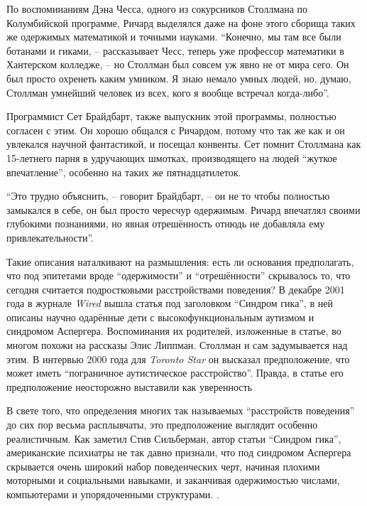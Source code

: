 По воспоминаниям Дэна Чесса, одного из сокурсников Столлмана по Колумбийской программе, Ричард выделялся даже на фоне этого сборища таких же одержимых математикой и точными науками. \enquote{Конечно, мы там все были ботанами и гиками, -- рассказывает Чесс, теперь уже профессор математики в Хантерском колледже, -- но Столлман был совсем уж явно не от мира сего. Он был просто охренеть каким умником. Я знаю немало умных людей, но, думаю, Столлман умнейший человек из всех, кого я вообще встречал когда-либо}.

Программист Сет Брайдбарт, также выпускник этой программы, полностью согласен с этим. Он хорошо общался с Ричардом, потому что так же как и он увлекался научной фантастикой, и посещал конвенты. Сет помнит Столлмана как 15-летнего парня в удручающих шмотках, производящего на людей \enquote{жуткое впечатление}, особенно на таких же пятнадцатилеток.

\enquote{Это трудно объяснить, -- говорит Брайдбарт, -- он не то чтобы полностью замыкался в себе, он был просто чересчур одержимым. Ричард впечатлял своими глубокими познаниями, но явная отрешённость отнюдь не добавляла ему привлекательности}.

Такие описания наталкивают на размышления: есть ли основания предполагать, что под эпитетами вроде \enquote{одержимости} и \enquote{отрешённости} скрывалось то, что сегодня считается подростковыми расстройствами поведения? В декабре 2001 года в журнале \textit{Wired} вышла статья под заголовком \enquote{Синдром гика}, в ней описаны научно одарённые дети с высокофункциональным аутизмом и синдромом Аспергера. Воспоминания их родителей, изложенные в статье, во многом похожи на рассказы Элис Липпман. Столлман и сам задумывается над этим. В интервью 2000 года для \textit{Toronto Star} он высказал предположение, что может иметь \enquote{пограничное аутистическое расстройство}. Правда, в статье его предположение неосторожно выставили как уверенность

В свете того, что определения многих так называемых \enquote{расстройств поведения} до сих пор весьма расплывчаты, это предположение выглядит особенно реалистичным. Как заметил Стив Сильберман, автор статьи \enquote{Синдром гика}, американские психиатры не так давно признали, что под синдромом Аспергера скрывается очень широкий набор поведенческих черт, начиная плохими моторными и социальными навыками, и заканчивая одержимостью числами, компьютерами и упорядоченными структурами. .

